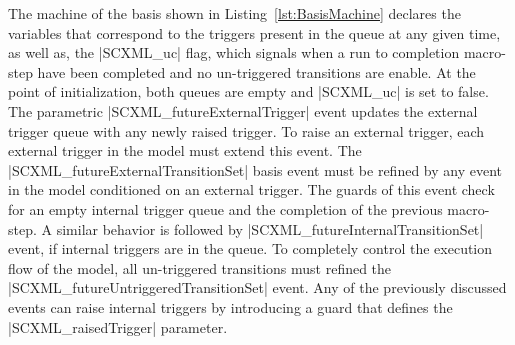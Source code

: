 The machine of the basis shown in Listing~\ref{lst:BasisMachine} declares the variables that correspond to the triggers 
present in the queue at any given time, as well as, the |SCXML_uc| flag, which signals when a run to completion macro-step 
have been completed and no un-triggered transitions are enable. At the point of initialization, both queues are empty and
|SCXML_uc| is set to false. The parametric |SCXML_futureExternalTrigger| event updates the external trigger queue with any 
newly raised trigger. To raise an external trigger, each external trigger in the model must extend this event. 
The |SCXML_futureExternalTransitionSet| basis event must be refined by any event in the model conditioned on an external trigger. 
The guards of this event check for an empty internal trigger queue and the completion of the previous macro-step. 
A similar behavior is followed by |SCXML_futureInternalTransitionSet| event, if internal triggers are in the queue.  
To completely control the execution flow of the model, all un-triggered transitions must refined the |SCXML_futureUntriggeredTransitionSet|
event. Any of the previously discussed events can raise internal triggers by introducing a guard that defines the |SCXML_raisedTrigger| parameter.

